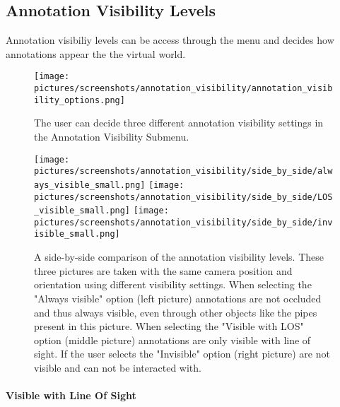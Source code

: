 
\subsection{Annotation Visibility Levels}
\label{sec:annotations}
Annotation visibiliy levels can be access through the menu and decides how annotations appear the the virtual world. 

\begin{figure}%
	\texttt{[image: pictures/screenshots/annotation\_visibility/annotation\_visibility\_options.png]}
	\caption[The Annotation Visibility Submenu]{The user can decide three different annotation visibility settings in the Annotation Visibility Submenu.}
	\label{fig:annotation_visibility_options}
\end{figure} 

\begin{figure}%
	\texttt{[image: pictures/screenshots/annotation\_visibility/side\_by\_side/always\_visible\_small.png]}
	\texttt{[image: pictures/screenshots/annotation\_visibility/side\_by\_side/LOS\_visible\_small.png]}
	\texttt{[image: pictures/screenshots/annotation\_visibility/side\_by\_side/invisible\_small.png]}
	\caption[Annotation visibility levels comparison]{A side-by-side comparison of the annotation visibility levels. These three pictures are taken with the same camera position
	and orientation using different visibility settings. When selecting the "Always visible" option (left picture) annotations are not occluded and thus always visible, even through other objects like
	the pipes present in this picture. When selecting the "Visible with LOS" option (middle picture) annotations are only visible with line of sight. 
	If the user selects the "Invisible" option (right picture) are not visible and can not be interacted with.}
	\label{fig:visibility_comparison}
\end{figure} 



\paragraph{Visible with Line Of Sight}


